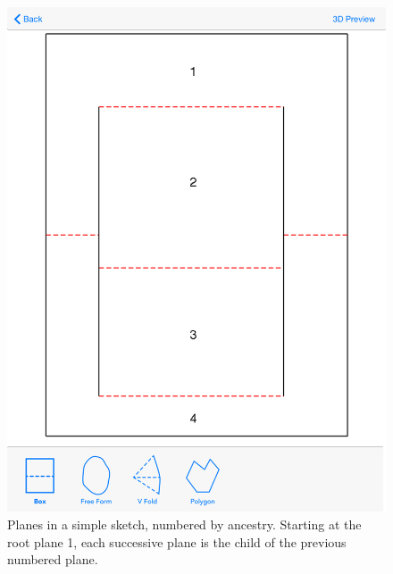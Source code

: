 \begin{figure}[htbp]
\centering
\includegraphics{figures/33_UI_Interface_Data_Structures/boxfold_planes.png}
\caption{Planes in a simple sketch, numbered by ancestry. Starting at
the root plane 1, each successive plane is the child of the previous
numbered plane.}
\end{figure}


